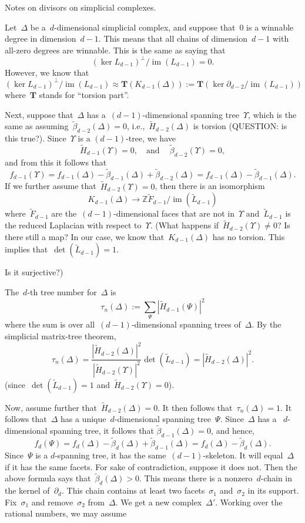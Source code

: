 \documentclass[12pt]{article}
\newcommand{\Z}{\mathbb{Z}}
\newcommand{\T}{\mathbf{T}}
\DeclareMathOperator{\im}{\mathrm{im}}
\begin{document}
\centerline{Notes on divisors on simplicial complexes.}
\bigskip

Let~$\Delta$ be a~$d$-dimensional simplicial complex, and suppose
that~$0$ is a winnable degree in dimension~$d-1$.  This means that all chains of
dimension~$d-1$ with all-zero degrees are winnable.  This is the same as saying
that
\[
  (\ker L_{d-1})^{\perp}/\im(L_{d-1})=0.
\]
However, we know that
\[
  (\ker L_{d-1})^{\perp}/\im(L_{d-1})\approx
  \T(K_{d-1}(\Delta)):=\T(\ker\partial_{d-2}/\im(L_{d-1}))
\]
where~$\T$ stands for ``torsion part''.  

Next, suppose that~$\Delta$ has a~$(d-1)$-dimensional spanning tree~$\Upsilon$, which is
the same as assuming~$\tilde{\beta}_{d-2}(\Delta)=0$, i.e.,~$\widetilde{H}_{d-2}(\Delta)$ is
torsion (QUESTION: is this true?).  Since~$\Upsilon$ is a $(d-1)$-tree, we have
\[
  \tilde{H}_{d-1}(\Upsilon)=0,\quad\text{and}\quad~\tilde{\beta}_{d-2}(\Upsilon)=0,
\]
and from this it follows that
\[
  f_{d-1}(\Upsilon)
  =f_{d-1}(\Delta)-\tilde{\beta}_{d-1}(\Delta)+\tilde{\beta}_{d-2}(\Delta)
  =f_{d-1}(\Delta)-\tilde{\beta}_{d-1}(\Delta).
\]
If we further assume that~$\widetilde{H}_{d-2}(\Upsilon)=0$, then there is an
isomorphism
\[
  K_{d-1}(\Delta)\to\Z\tilde{F}_{d-1}/\im(\tilde{L}_{d-1})
\]
where~$\tilde{F}_{d-1}$ are the~$(d-1)$-dimensional faces that are not
in~$\Upsilon$ and~$\tilde{L}_{d-1}$ is the reduced Laplacian with respect
to~$\Upsilon$.  (What happens if~$\widetilde{H}_{d-2}(\Upsilon)\neq 0$?  Is
  there still a map?  In our case, we know that~$K_{d-1}(\Delta)$ has no
  torsion.  This implies that~$\det(\tilde{L}_{d-1})=1$.

Is it surjective?)

The~$d$-th tree number for~$\Delta$ is
\[
  \tau_n(\Delta):=\sum_{\Psi}|\widetilde{H}_{d-1}(\Psi)|^2
\]
where the sum is over all~$(d-1)$-dimensional spanning trees of~$\Delta$.
By the simplicial matrix-tree theorem,
\[
  \tau_n(\Delta)
  =\frac{|\widetilde{H}_{d-2}(\Delta)|^2}{|\widetilde{H}_{d-2}(\Upsilon)|^2}\det(\tilde{L}_{d-1})
  =|\widetilde{H}_{d-2}(\Delta)|^2.
\]
(since~$\det(\tilde{L}_{d-1})=1$ and~$\widetilde{H}_{d-2}(\Upsilon)=0$).

Now, assume further that~$\widetilde{H}_{d-2}(\Delta)=0$.  It then follows
that~$\tau_n(\Delta)=1$.  It follows that~$\Delta$ has a
unique~$d$-dimensional spanning tree~$\Psi$.  Since~$\Delta$ has a
~$d$-dimensional spanning tree, it follows that $\tilde{\beta}_{d-1}(\Delta)=0$,
and hence,
\[
  f_{d}(\Psi)
  =f_{d}(\Delta)-\tilde{\beta}_{d}(\Delta)+\tilde{\beta}_{d-1}(\Delta)
  =f_{d}(\Delta)-\tilde{\beta}_{d}(\Delta).
\]
Since~$\Psi$ is a $d$-spanning tree, it has the same~$(d-1)$-skeleton. It will
equal~$\Delta$ if it has the same facets.  For sake of contradiction, suppose it
does not.  Then the above formula says that~$\tilde{\beta}_{d}(\Delta)>0$.  This
means there is a nonzero~$d$-chain in the kernel of~$\partial_d$.  This chain
contains at least two facets~$\sigma_1$ and~$\sigma_2$ in its support.
Fix~$\sigma_1$ and remove~$\sigma_2$ from~$\Delta$.  We get a new
complex~$\Delta'$.  Working over the rational numbers, we may assume 
\end{document}
